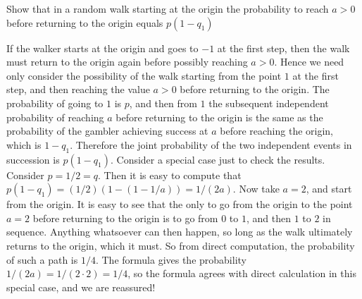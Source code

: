 \begin{problem}
 Show that in a random walk starting at the origin the
    probability to reach  $a>0$ before returning to the origin
    equals $p(1-q_1)$
\end{problem} 
\begin{solution} 

If the walker starts at the origin and
goes to $-1$ at the first step, then the walk must return to
the origin again before possibly reaching $a>0$.  Hence we
need only consider the possibility of the walk starting from
the point $1$ at the first step, and then reaching the value
$a>0$ before returning to the origin.  The probability of
going to $1$ is $p$, and then from $1$ the subsequent
independent probability of reaching $a$ before returning to
the origin is the same as the probability of the gambler
achieving success at $a$ before reaching the origin, which is
$1-q_{1}$.  Therefore the joint probability of the two
independent events
in succession is $p(1-q_{1})$.
Consider a special case just to check the results.  Consider $p =  1/2 = q$.  
Then it is easy to compute that $p(1-q_1) = (1/2)(1 - (1 - 1/a)) = 1/(2a)$.  
Now take $a = 2$, and start from the origin.  It is easy to see that the only to go from
the origin to the point $a=2$ before returning to the origin is
to go from $0$ to $1$, and then $1$ to $2$ in sequence.
Anything whatsoever can then happen, so long as the walk
ultimately returns to the origin, which it must.  So from direct
computation, the probability of such a path is $1/4$.  The
formula gives the probability $1/(2a) = 1/(2 \cdot 2) = 1/4$, so the
formula agrees with direct calculation in this special case,
and we are reassured!  
\end{solution}

